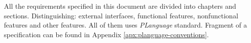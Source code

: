 	All the requirements specified in this document are divided into chapters and sections. Distinguishing: external interfaces, functional features, nonfunctional features and other features. All of them uses \emph{PLanguage} standard. Fragment of a specification can be found in Appendix \ref{apx:planguage-conventions}.
	\begin{comment}		
		\begin{table}[!htbp]
			\centering
			\caption{Impact and likelihood matrix.}
			\label{tab:impact-and-likelihood-matrix}
			\begin{tabular}[width=\textwidth]{cc|c|c|c|c|c|}
				\cline{3-7}
				&  & \multicolumn{5}{c|}{\textit{\textbf{Impact}}} \\ \cline{3-7} 
				&  & \textit{\textbf{NS}} & \textit{\textbf{Minor}} & \textit{\textbf{Major}} & \textit{\textbf{Moderate}} & \textbf{Severe} \\ \hline
				\multicolumn{1}{|c|}{} & \textit{\textbf{Almost Certain}} & \cellcolor[HTML]{FFFE65}\textit{Medium} & \cellcolor[HTML]{F8A102}\textit{High} & \cellcolor[HTML]{FE0000}\textit{Very High} & \cellcolor[HTML]{FE0000}\textit{Very High} & \cellcolor[HTML]{FE0000}\textit{Very High} \\ \cline{2-7} 
				\multicolumn{1}{|c|}{} & \textit{\textbf{Likely}} & \cellcolor[HTML]{FFFE65}\textit{Medium} & \cellcolor[HTML]{F8A102}\textit{High} & \cellcolor[HTML]{F8A102}\textit{High} & \cellcolor[HTML]{FE0000}\textit{Very High} & \cellcolor[HTML]{FE0000}\textit{Very High} \\ \cline{2-7} 
				\multicolumn{1}{|c|}{} & \textit{\textbf{Possible}} & \cellcolor[HTML]{32CB00}\textit{Low} & \cellcolor[HTML]{FFFE65}\textit{Medium} & \cellcolor[HTML]{F8A102}\textit{High} & \cellcolor[HTML]{F8A102}\textit{High} & \cellcolor[HTML]{FE0000}\textit{Very High} \\ \cline{2-7} 
				\multicolumn{1}{|c|}{} & \textit{\textbf{Unlikely}} & \cellcolor[HTML]{32CB00}\textit{Low} & \cellcolor[HTML]{32CB00}\textit{Low} & \cellcolor[HTML]{FFFE65}\textit{Medium} & \cellcolor[HTML]{FFFE65}\textit{Medium} & \cellcolor[HTML]{F8A102}\textit{High} \\ \cline{2-7} 
				\multicolumn{1}{|c|}{\multirow{-5}{*}{\rotatebox[origin=c]{90}{\textit{\textbf{Likelihood}}}}} & \textit{\textbf{Rare}} & \cellcolor[HTML]{32CB00}\textit{Low} & \cellcolor[HTML]{32CB00}\textit{Low} & \cellcolor[HTML]{32CB00}\textit{Low} & \cellcolor[HTML]{32CB00}\textit{Low} & \cellcolor[HTML]{FFFE65}\textit{Medium} \\ \hline
			\end{tabular}
		\end{table}
	

\end{comment}
